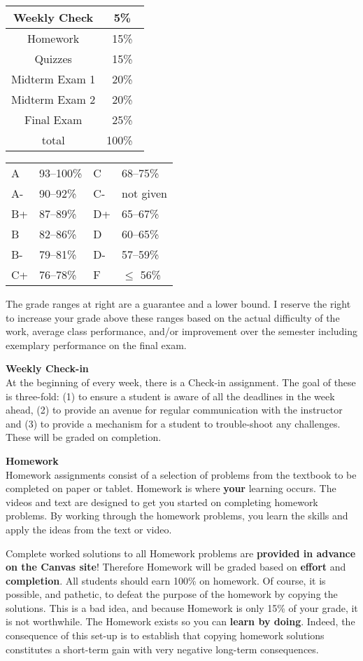 \documentclass[12pt]{article}
\renewcommand{\emph}[1]{\textsf{\textbf{#1}}}
\newcommand{\localhead}[1]{\par\smallskip\textbf{#1} \smallskip\nobreak\\}%
\def\heading#1{\localhead{\large\emph{#1}}}
\begin{document}
\begin{multicols}{2}
\begin{tabular}{|c|c|}
\hline
Weekly Check & 5\%\\
\hline
Homework & 15\% \\
\hline
Quizzes & 15\% \\
\hline
Midterm Exam 1 & 20\% \\
\hline
Midterm Exam 2 & 20\%  \\
\hline
Final Exam & 25\% \\
\hline
total & 100\% \, \\
\hline
\end{tabular}


\begin{tabular}{llll}
A  & 93--100\%& C  & 68--75\%  \\
A- & 90--92\% & C- & not given \\
B+ & 87--89\% & D+ & 65--67\%  \\
B  & 82--86\% & D  & 60--65\%  \\
B- & 79--81\% & D- & 57--59\%  \\
C+ & 76--78\% & F  & $\le$ 56\%
\end{tabular}
\end{multicols}

The grade ranges at right are a guarantee and a lower bound. I reserve the right to increase your grade above these ranges based on the actual difficulty of the work, average class performance, and/or improvement over the semester including exemplary performance on the final exam. 

\heading{Weekly Check-in}
At the beginning of every week, there is a Check-in assignment. The goal of these is three-fold: (1) to ensure a student is aware of all the deadlines in the week ahead, (2) to provide an avenue for regular communication with the instructor and (3) to provide a mechanism for a student to trouble-shoot any challenges. These will be graded on completion. 

\newpage
\heading{Homework}
Homework assignments consist of a selection of problems from the textbook to be completed on paper or tablet.  Homework is where \textbf{your} learning occurs. The videos and text are designed to get you started on completing homework problems. By working through the homework problems, you learn the skills and apply the ideas from the text or video.

Complete worked solutions to all Homework problems are \emph{provided in advance on the Canvas site}!  Therefore Homework will be graded based on \emph{effort} and \emph{completion}.  All students should earn 100\% on homework.  Of course, it is possible, and pathetic, to defeat the purpose of the homework by copying the solutions.  This is a bad idea, and because Homework is only 15\% of your grade, it is not worthwhile.  The Homework exists so you can \emph{learn by doing}. Indeed, the consequence of this set-up is to establish that copying homework solutions constitutes a short-term gain with very negative long-term consequences. 
\end{document}
